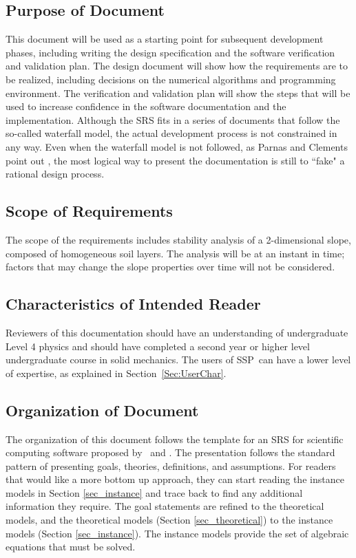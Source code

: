\documentclass[12pt]{article}
\newcommand{\progname}{SSP}
\begin{document}
\subsection{Purpose of Document}

This document will be used as a starting point for subsequent development 
phases, including writing the design specification and the software verification
 and validation plan. The design document will show how the requirements
 are to be realized, including decisions on the numerical algorithms and 
programming environment. The verification and validation plan will show
 the steps that will be used to increase confidence in the software 
 documentation
 and the implementation. Although the SRS fits in a series of documents 
that follow the so-called waterfall model, the actual development process
 is not constrained in any way. Even when the waterfall model is not followed, 
as Parnas and Clements point out \cite{ParnasAndClements1986}, the most logical 
way to present the documentation is still to ``fake" a rational design process.

\subsection{Scope of Requirements} 

The scope of the requirements includes stability analysis of a 2-dimensional 
slope, composed of homogeneous soil layers. The analysis will be at an instant 
in time; factors that may change the slope properties over time will not be 
considered.

\subsection{Characteristics of Intended Reader}
\label{Sec:CharofInteRead}
Reviewers of this documentation should have an understanding of undergraduate 
Level 4 physics and should have completed a second year or higher level 
undergraduate course in solid mechanics. The users of \progname\ can have a 
lower level of expertise, as explained in Section~\ref{Sec:UserChar}.

\subsection{Organization of Document}

The organization of this document follows the template for an SRS for
scientific computing software proposed by~\cite{Koothoor2013} and
\cite{SmithAndLai2005}.  The presentation follows the standard pattern
of presenting goals, theories, definitions, and assumptions.  For
readers that would like a more bottom up approach, they can start
reading the instance models in Section \ref{sec_instance} and trace
back to find any additional information they require. The goal statements 
are refined to the theoretical models, and the theoretical models (Section 
\ref{sec_theoretical}) to the instance models (Section \ref{sec_instance}). The 
instance models provide the set of algebraic equations that must be solved.
\end{document}
